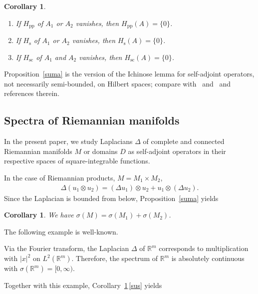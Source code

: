 \documentclass[pdftex]{sigma}
\numberwithin{equation}{section}
\newtheorem{Corollary}[Theorem]{Corollary}
\def\p{\mathrm{pp}}
\def\sc{\mathrm{sc}}
\def\s{\mathrm s}
\def\R{\mathbb R}
\begin{document}
\begin{Corollary}\label{sumc}\quad
\begin{enumerate}[label={\rm (\arabic*)}]\itemsep=0pt
\item If $H_{\p}$ of $A_1$ \emph{or} $A_2$ vanishes, then $H_{\p}(A)=\{0\}$.%
\item If $H_{\s}$ of $A_1$ \emph{or} $A_2$ vanishes, then $H_{\s}(A)=\{0\}$.\label{sus}
\item If $H_{\sc}$ of $A_1$ \emph{and} $A_2$ vanishes, then $H_{\sc}(A)=\{0\}$.%
\end{enumerate}
\end{Corollary}

Proposition~\ref{suma} is the version of the Ichinose lemma for self-adjoint operators, not necessarily semi-bounded, on Hilbert spaces;
compare with~\cite[Theorem 4.1]{Ich72} and~\cite[Section XIII.9]{ReedSimon78}
and references therein.

\subsection{Spectra of Riemannian manifolds}\label{subrie}
In the present paper, we study Laplacians $\Delta$
of complete and connected Riemannian manifolds $M$ or domains $D$
as self-adjoint operators in their respective spaces of square-integrable functions.

In the case of Riemannian products, $M=M_1\times M_2$,
\begin{align*}%
	\Delta(u_1\otimes u_2) = (\Delta u_1)\otimes u_2 + u_1\otimes(\Delta u_2).
\end{align*}
Since the Laplacian is bounded from below, Proposition~\ref{suma} yields

\begin{Corollary}\label{sumdel}
We have $\sigma(M)=\sigma(M_1)+\sigma(M_2)$.
\end{Corollary}

The following example is well-known.

\begin{exa}\label{rmac}
Via the Fourier transform, the Laplacian $\Delta$ of $\R^m$ corresponds to multiplication with $|x|^2$ on $L^2(\R^m)$.
Therefore, the spectrum of $\R^m$ is absolutely continuous with ${\sigma(\R^m)=[0,\infty)}$.
\end{exa}

Together with this example, Corollary~\ref{sumc}\,\ref{sus} yields
\end{document}
